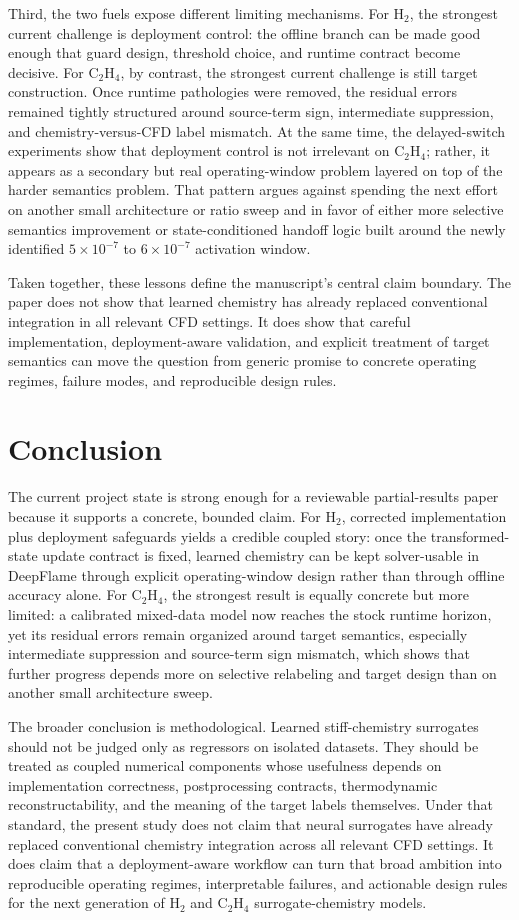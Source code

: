 \documentclass[11pt]{article}
\begin{document}
Third, the two fuels expose different limiting mechanisms. For H$_2$, the strongest current challenge is deployment control: the offline branch can be made good enough that guard design, threshold choice, and runtime contract become decisive. For C$_2$H$_4$, by contrast, the strongest current challenge is still target construction. Once runtime pathologies were removed, the residual errors remained tightly structured around source-term sign, intermediate suppression, and chemistry-versus-CFD label mismatch. At the same time, the delayed-switch experiments show that deployment control is not irrelevant on C$_2$H$_4$; rather, it appears as a secondary but real operating-window problem layered on top of the harder semantics problem. That pattern argues against spending the next effort on another small architecture or ratio sweep and in favor of either more selective semantics improvement or state-conditioned handoff logic built around the newly identified $5\times10^{-7}$ to $6\times10^{-7}$ activation window.

Taken together, these lessons define the manuscript's central claim boundary. The paper does not show that learned chemistry has already replaced conventional integration in all relevant CFD settings. It does show that careful implementation, deployment-aware validation, and explicit treatment of target semantics can move the question from generic promise to concrete operating regimes, failure modes, and reproducible design rules.

\section{Conclusion}
The current project state is strong enough for a reviewable partial-results paper because it supports a concrete, bounded claim. For H$_2$, corrected implementation plus deployment safeguards yields a credible coupled story: once the transformed-state update contract is fixed, learned chemistry can be kept solver-usable in DeepFlame through explicit operating-window design rather than through offline accuracy alone. For C$_2$H$_4$, the strongest result is equally concrete but more limited: a calibrated mixed-data model now reaches the stock runtime horizon, yet its residual errors remain organized around target semantics, especially intermediate suppression and source-term sign mismatch, which shows that further progress depends more on selective relabeling and target design than on another small architecture sweep.

The broader conclusion is methodological. Learned stiff-chemistry surrogates should not be judged only as regressors on isolated datasets. They should be treated as coupled numerical components whose usefulness depends on implementation correctness, postprocessing contracts, thermodynamic reconstructability, and the meaning of the target labels themselves. Under that standard, the present study does not claim that neural surrogates have already replaced conventional chemistry integration across all relevant CFD settings. It does claim that a deployment-aware workflow can turn that broad ambition into reproducible operating regimes, interpretable failures, and actionable design rules for the next generation of H$_2$ and C$_2$H$_4$ surrogate-chemistry models.
\end{document}
